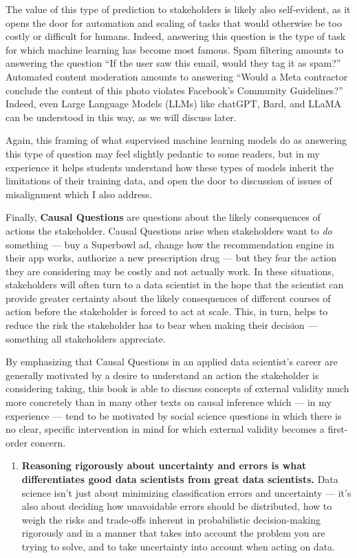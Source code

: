 \documentclass[12pt]{article}
\begin{document}
The value of this type of prediction to stakeholders is likely also
self-evident, as it opens the door for automation and scaling of tasks
that would otherwise be too costly or difficult for humans. Indeed,
answering this question is the type of task for which machine learning
has become most famous. Spam filtering amounts to answering the question
``If the user saw this email, would they tag it as spam?'' Automated
content moderation amounts to answering ``Would a Meta contractor
conclude the content of this photo violates Facebook's Community
Guidelines?'' Indeed, even Large Language Models (LLMs) like chatGPT,
Bard, and LLaMA can be understood in this way, as we will discuss later.

Again, this framing of what supervised machine learning models do as
answering this type of question may feel slightly pedantic to some
readers, but in my experience it helps students understand how these
types of models inherit the limitations of their training data, and open
the door to discussion of issues of misalignment which I also address.

Finally, \textbf{Causal Questions} are questions about the likely
consequences of actions the stakeholder. Causal Questions arise when
stakeholders want to \emph{do} something --- buy a Superbowl ad, change
how the recommendation engine in their app works, authorize a new
prescription drug --- but they fear the action they are considering may
be costly and not actually work. In these situations, stakeholders will
often turn to a data scientist in the hope that the scientist can
provide greater certainty about the likely consequences of different
courses of action before the stakeholder is forced to act at scale.
This, in turn, helps to reduce the risk the stakeholder has to bear when
making their decision --- something all stakeholders appreciate.

By emphasizing that Causal Questions in an applied data scientist's
career are generally motivated by a desire to understand an action the
stakeholder is considering taking, this book is able to discuss concepts
of external validity much more concretely than in many other texts on
causal inference which --- in my experience --- tend to be motivated by
social science questions in which there is no clear, specific
intervention in mind for which external validity becomes a first-order
concern.

\begin{enumerate}
\def\labelenumi{\arabic{enumi}.}
\setcounter{enumi}{3}

\item
  \textbf{Reasoning rigorously about uncertainty and errors is what
  differentiates good data scientists from great data scientists.} Data
  science isn't just about minimizing classification errors and
  uncertainty --- it's also about deciding how unavoidable errors should
  be distributed, how to weigh the risks and trade-offs inherent in
  probabilistic decision-making rigorously and in a manner that takes
  into account the problem you are trying to solve, and to take
  uncertainty into account when acting on data.
\end{enumerate}
\end{document}
